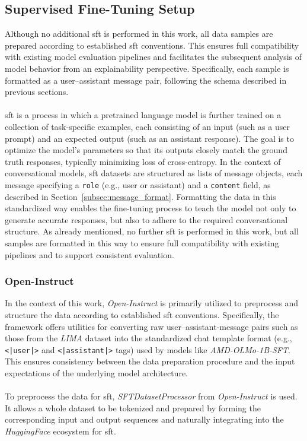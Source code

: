 \subsection{Supervised Fine-Tuning Setup}
Although no additional \acrfull{sft} is performed in this work, all data samples are prepared according to established \acrshort{sft} conventions. This ensures full compatibility with existing model evaluation pipelines and facilitates the subsequent analysis of model behavior from an explainability perspective. Specifically, each sample is formatted as a user–assistant message pair, following the schema described in previous sections.
\\\\
\acrfull{sft} is a process in which a pretrained language model is further trained on a collection of task-specific examples, each consisting of an input (such as a user prompt) and an expected output (such as an assistant response). The goal is to optimize the model’s parameters so that its outputs closely match the ground truth responses, typically minimizing loss of cross-entropy. In the context of conversational models, \acrshort{sft} datasets are structured as lists of message objects, each message specifying a \texttt{role} (e.g., user or assistant) and a \texttt{content} field, as described in Section~\ref{subsec:message_format}. Formatting the data in this standardized way enables the fine-tuning process to teach the model not only to generate accurate responses, but also to adhere to the required conversational structure. As already mentioned, no further \acrshort{sft} is performed in this work, but all samples are formatted in this way to ensure full compatibility with existing pipelines and to support consistent evaluation.

\subsubsection{Open-Instruct}
In the context of this work, \emph{Open-Instruct} is primarily utilized to preprocess and structure the data according to established \acrshort{sft} conventions. Specifically, the framework offers utilities for converting raw user–assistant-message pairs such as those from the \emph{LIMA} dataset into the standardized chat template format (e.g., \texttt{<|user|>} and \texttt{<|assistant|>} tags) used by models like \emph{AMD-OLMo-1B-SFT}. This ensures consistency between the data preparation procedure and the input expectations of the underlying model architecture.
\\\\
To preprocess the data for \acrfull{sft}, \emph{SFTDatasetProcessor} from \emph{Open-Instruct} is used. It allows a whole dataset to be tokenized and prepared by forming the corresponding input and output sequences and naturally integrating into the \emph{HuggingFace} ecosystem for \acrshort{sft}.

